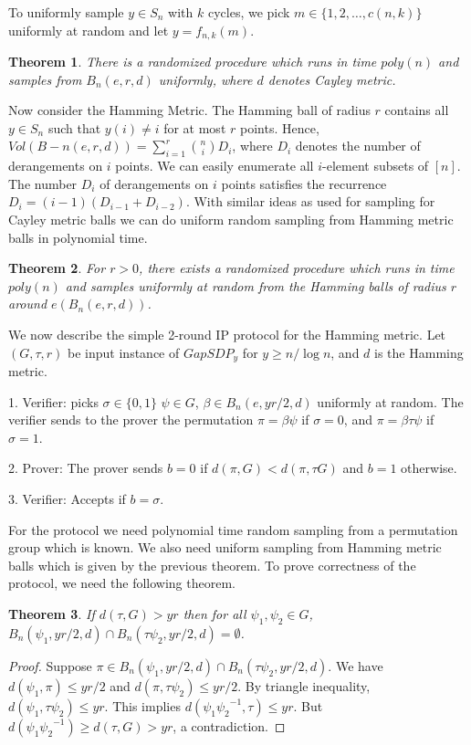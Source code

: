 \documentclass[12pt]{report}
\newtheorem{theorem}{Theorem}[section]
\begin{document}
To uniformly sample $y \in S_n$ with $k$ cycles, we pick $m \in \{1, 2, \dots, c(n, k)\}$ uniformly at random and let $y = f_{n, k}(m)$.

\begin{theorem}
	There is a randomized procedure which runs in time $poly(n)$ and samples from $B_n(e, r, d)$ uniformly, where $d$ denotes Cayley metric.
\end{theorem}

Now consider the Hamming Metric. The Hamming ball of radius $r$ contains all $y \in S_n$ such that $y(i) \neq i$ for at most $r$ points. Hence, $Vol(B-n(e, r, d)) = \sum_{i = 1}^{r} {n \choose i} D_i$, where $D_i$ denotes the number of derangements on $i$ points. We can easily enumerate all $i$-element subsets of $[n]$. The number $D_i$ of derangements on $i$ points satisfies the recurrence $D_i = (i - 1)(D_{i - 1} + D_{i - 2})$. With similar ideas as used for sampling for Cayley metric balls we can do uniform random sampling from Hamming metric balls in polynomial time.

\begin{theorem}
	For $r > 0$, there exists a randomized procedure which runs in time $poly(n)$ and samples uniformly at random from the Hamming balls of radius $r$ around
	$e (B_n(e, r, d))$.
\end{theorem}

We now describe the simple 2-round IP protocol for the Hamming metric. Let $(G, \tau, r)$ be input instance of $GapSDP_y$ for $y \geq n / \log n$, and $d$ is the Hamming metric.

1. Verifier: picks $\sigma \in \{0, 1\}$ $\psi \in G$, $\beta \in B_n(e, yr/2, d)$ uniformly at random. The verifier sends to the prover the permutation $\pi = \beta \psi$ if $\sigma = 0$, and $\pi = \beta \tau \psi$ if $\sigma = 1$.

2. Prover: The prover sends $b = 0$ if $d(\pi, G) < d(\pi, \tau G)$ and $b = 1$ otherwise.

3. Verifier: Accepts if $b = \sigma$.

For the protocol we need polynomial time random sampling from a permutation group
which is known. We also need uniform sampling from Hamming metric balls which is given by the previous theorem. To prove correctness of the protocol, we need the following theorem.

\begin{theorem}
	If $d(\tau, G) > yr$ then for all $\psi_1, \psi_2 \in G$, $B_n(\psi_1, yr/2, d) \cap B_n(\tau \psi_2, yr/2, d) = \emptyset$.
\end{theorem}
\begin{proof}
	Suppose $\pi \in B_n(\psi_1, yr/2, d) \cap B_n(\tau \psi_2, yr/2, d)$. We have $d(\psi_1, \pi) \leq yr/2$ and $d(\pi, \tau \psi_2) \leq yr/2$. By triangle inequality, $d(\psi_1, \tau \psi_2) \leq yr$. This implies $d(\psi_1 {\psi_2}^{-1}, \tau) \leq yr$. But $d(\psi_1 {\psi_2}^{-1}) \geq d(\tau, G) > yr$, a contradiction.
\end{proof}
\end{document}
